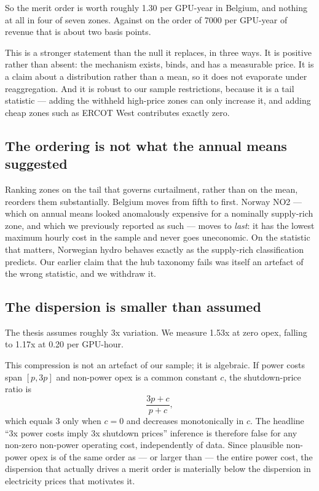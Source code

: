 \documentclass[11pt]{article}
\begin{document}
So the merit order is worth roughly \SI{1.30}{\usd} per GPU-year in
Belgium, and nothing at all in four of seven zones. Against on the order of
\SI{7000}{\usd} per GPU-year of revenue that is about two basis points.

This is a stronger statement than the null it replaces, in three ways.
It is positive rather than absent: the mechanism exists, binds, and has a
measurable price. It is a claim about a distribution rather than a mean,
so it does not evaporate under reaggregation. And it is robust to our
sample restrictions, because it is a tail statistic --- adding the
withheld high-price zones can only increase it, and adding cheap zones
such as ERCOT West contributes exactly zero.

\subsection{The ordering is not what the annual means suggested}

Ranking zones on the tail that governs curtailment, rather than on the
mean, reorders them substantially. Belgium moves from fifth to first.
Norway NO2 --- which on annual means looked anomalously expensive for a
nominally supply-rich zone, and which we previously reported as such ---
moves to \emph{last}: it has the lowest maximum hourly cost in the sample
and never goes uneconomic. On the statistic that matters, Norwegian hydro
behaves exactly as the supply-rich classification predicts. Our earlier
claim that the hub taxonomy fails was itself an artefact of the wrong
statistic, and we withdraw it.

\subsection{The dispersion is smaller than assumed}

The thesis assumes roughly \num{3}x variation. We measure \num{1.53}x at
zero opex, falling to \num{1.17}x at \SI{0.20}{\usd} per GPU-hour.

This compression is not an artefact of our sample; it is algebraic. If
power costs span $[p, 3p]$ and non-power opex is a common constant $c$,
the shutdown-price ratio is
\begin{equation}
  \label{eq:dispersion}
  \frac{3p + c}{p + c},
\end{equation}
which equals \num{3} only when $c = 0$ and decreases monotonically in $c$.
The headline ``\num{3}x power costs imply \num{3}x shutdown prices''
inference is therefore false for any non-zero non-power operating cost,
independently of data. Since plausible non-power opex is of the same order
as --- or larger than --- the entire power cost, the dispersion that
actually drives a merit order is materially below the dispersion in
electricity prices that motivates it.
\end{document}
